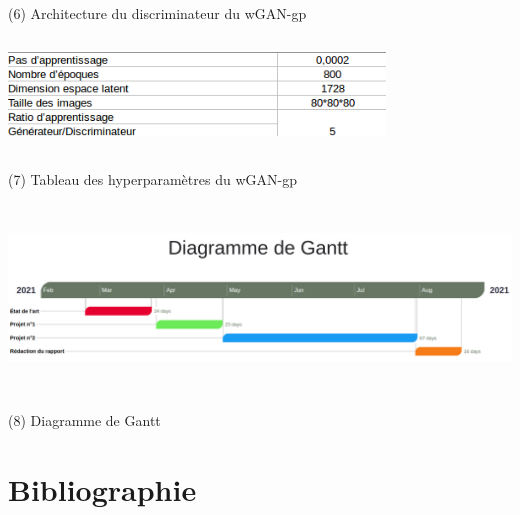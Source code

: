 \documentclass[12pt, oneside, a4paper, titlepage]{article}
\begin{document}
     \centerline{ (6) Architecture du discriminateur du wGAN-gp}
    \centerline{\includegraphics[width=10cm, height=3cm]{tableau.png}}
   \centerline{ (7) Tableau des hyperparamètres du wGAN-gp}
 \vspace{1cm} 
 
  \centerline{\includegraphics[width=16cm, height=5cm]{Gantt.png}}
   \centerline{ (8) Diagramme de Gantt}
 \vspace{5mm} 
 
 
 
\newpage
\section{\hspace{4mm}Bibliographie}

\vspace{2cm} 



\end{document}
